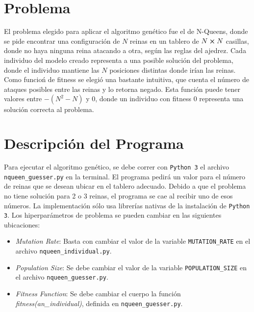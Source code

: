 \documentclass[letterpaper,11pt]{article} %
\begin{document}








\section*{Problema}
  El problema elegido para aplicar el algoritmo genético fue el de N-Queens, donde se pide encontrar una configuración de $N$ reinas en un tablero de $N\cross N$ casillas, donde no haya ninguna reina atacando a otra, según las reglas del ajedrez. Cada individuo del modelo creado representa a una posible solución del problema, donde el individuo mantiene las $N$ posiciones distintas donde irían las reinas. Como funcioń de fitness se elegió una bastante intuitiva, que cuenta el número de ataques posibles entre las reinas y lo retorna negado. Esta función puede tener valores entre $-(N^2 - N)$ y $0$, donde un individuo con fitness 0 representa una solución correcta al problema.

\section*{Descripción del Programa}
  Para ejecutar el algoritmo genético, se debe correr con \texttt{Python 3} el archivo \texttt{nqueen\_guesser.py} en la terminal. El programa pedirá un valor para el número de reinas que se desean ubicar en el tablero adecuado. Debido a que el problema no tiene solución para 2 o 3 reinas, el programa se cae al recibir uno de esos números. La implementación sólo usa librerías nativas de la instalación de \texttt{Python 3}. Los hiperparámetros de problema se pueden cambiar en las siguientes ubicaciones:
  
  \begin{itemize}
    \item \textit{Mutation Rate}: Basta con cambiar el valor de la variable \texttt{MUTATION\_RATE} en el archivo \texttt{nqueen\_individual.py}.
    \item \textit{Population Size}: Se debe cambiar el valor de la variable \texttt{POPULATION\_SIZE} en el archivo \texttt{nqueen\_guesser.py}.
    \item \textit{Fitness Function}: Se debe cambiar el cuerpo la función \textit{fitness(an\_individual)}, definida en \texttt{nqueen\_guesser.py}.
  \end{itemize}
\end{document}
